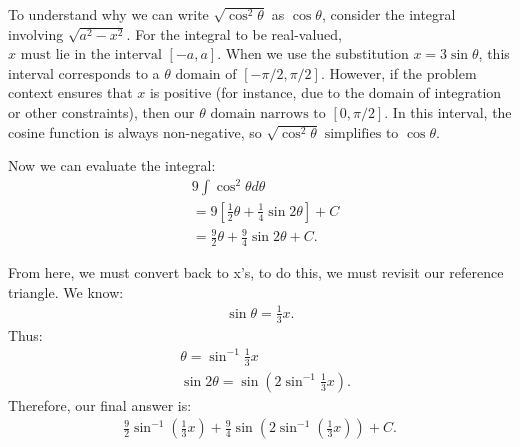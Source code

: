 \documentclass{report}
\begin{document}
    \bigbreak \noindent 
   To understand why we can write $ \sqrt{\cos^2{\theta}}$  as  $\cos{\theta}$, consider the integral involving $\sqrt{a^2 - x^2}$. For the integral to be real-valued, $x \text{ must lie in the interval } [-a, a]$. When we use the substitution $x = 3\sin{\theta}$,  this interval corresponds to a $ \theta \text{ domain of } [-\pi/2, \pi/2]$. However, if the problem context ensures that  $x$ is positive (for instance, due to the domain of integration or other constraints), then our  $\theta \text{ domain narrows to } [0, \pi/2]$. In this interval, the cosine function is always non-negative, so $ \sqrt{\cos^2{\theta}} \text{ simplifies to } \cos{\theta}$.

   \pagebreak \bigbreak \noindent 
   Now we can evaluate the integral:
   \begin{align*}
       &9\int \cos^{2}{\theta }d\theta  \\
       &=9 \left[\frac{1}{2}\theta +\frac{1}{4}\sin{2\theta }\right] + C \\
       &=\frac{9}{2}\theta +\frac{9}{4}\sin{2\theta } + C
   .\end{align*}
   \bigbreak \noindent 
   \begin{minipage}[]{0.47\textwidth}
       From here, we must convert back to x's, to do this, we must revisit our reference triangle. We know:
       \begin{align*}
           \sin{\theta } = \frac{1}{3}x
       .\end{align*}
       \bigbreak \noindent 
       Thus:
       \begin{align*}
           &\theta  = \sin^{-1}{\frac{1}{3}x} \\
           &\sin{2\theta } = \sin{\left(2\sin^{-1}{\frac{1}{3}x}\right)}
       .\end{align*}
       \bigbreak \noindent 
       Therefore, our final answer is:
       \begin{align*}
           \frac{9}{2}\sin^{-1}{\left(\frac{1}{3}x\right)}+\frac{9}{4}\sin{\left(2\sin^{-1}{\left(\frac{1}{3}x\right)}\right)} + C
       .\end{align*}
   \end{minipage}
   \hspace{.5in}
   \begin{minipage}[]{0.47\textwidth}
   \end{minipage}

   \bigbreak \noindent 
\end{document}

